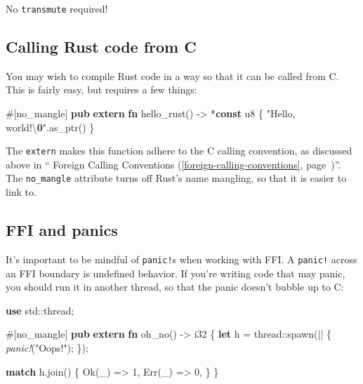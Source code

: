 \documentclass[a4paper,]{book}
\renewcommand*{\hyperlink}[2]{%
 #2 (\autoref{#1}, page~\pageref{#1})}
\newenvironment{Shaded}{\begin{snugshade}}{\end{snugshade}}
\newcommand{\KeywordTok}[1]{\textcolor[rgb]{0.13,0.29,0.53}{\textbf{{#1}}}}
\newcommand{\DataTypeTok}[1]{\textcolor[rgb]{0.13,0.29,0.53}{{#1}}}
\newcommand{\DecValTok}[1]{\textcolor[rgb]{0.00,0.00,0.81}{{#1}}}
\newcommand{\ConstantTok}[1]{\textcolor[rgb]{0.00,0.00,0.00}{{#1}}}
\newcommand{\SpecialCharTok}[1]{\textcolor[rgb]{0.00,0.00,0.00}{{#1}}}
\newcommand{\StringTok}[1]{\textcolor[rgb]{0.31,0.60,0.02}{{#1}}}
\newcommand{\PreprocessorTok}[1]{\textcolor[rgb]{0.56,0.35,0.01}{\textit{{#1}}}}
\newcommand{\AttributeTok}[1]{\textcolor[rgb]{0.77,0.63,0.00}{{#1}}}
\newcommand{\ErrorTok}[1]{\textcolor[rgb]{0.64,0.00,0.00}{\textbf{{#1}}}}
\newcommand{\NormalTok}[1]{{#1}}
\begin{document}
No \texttt{transmute} required!

\subsection{Calling Rust code from C}\label{calling-rust-code-from-c}

You may wish to compile Rust code in a way so that it can be called from
C. This is fairly easy, but requires a few things:

\begin{Shaded}
\begin{Highlighting}[]
\AttributeTok{#[}\NormalTok{no_mangle}\AttributeTok{]}
\KeywordTok{pub} \KeywordTok{extern} \KeywordTok{fn} \NormalTok{hello_rust() -> *}\KeywordTok{const} \DataTypeTok{u8} \NormalTok{\{}
    \StringTok{"Hello, world!}\SpecialCharTok{\textbackslash{}}\ErrorTok{0}\StringTok{"}\NormalTok{.as_ptr()}
\NormalTok{\}}
\end{Highlighting}
\end{Shaded}

The \texttt{extern} makes this function adhere to the C calling
convention, as discussed above in
``\protect\hyperlink{foreign-calling-conventions}{Foreign Calling
Conventions}''. The \texttt{no\_mangle} attribute turns off Rust's name
mangling, so that it is easier to link to.

\subsection{FFI and panics}\label{ffi-and-panics}

It's important to be mindful of \texttt{panic!}s when working with FFI.
A \texttt{panic!} across an FFI boundary is undefined behavior. If
you're writing code that may panic, you should run it in another thread,
so that the panic doesn't bubble up to C:

\begin{Shaded}
\begin{Highlighting}[]
\KeywordTok{use} \NormalTok{std::thread;}

\AttributeTok{#[}\NormalTok{no_mangle}\AttributeTok{]}
\KeywordTok{pub} \KeywordTok{extern} \KeywordTok{fn} \NormalTok{oh_no() -> }\DataTypeTok{i32} \NormalTok{\{}
    \KeywordTok{let} \NormalTok{h = thread::spawn(|| \{}
        \PreprocessorTok{panic!}\NormalTok{(}\StringTok{"Oops!"}\NormalTok{);}
    \NormalTok{\});}

    \KeywordTok{match} \NormalTok{h.join() \{}
        \ConstantTok{Ok}\NormalTok{(_) => }\DecValTok{1}\NormalTok{,}
        \ConstantTok{Err}\NormalTok{(_) => }\DecValTok{0}\NormalTok{,}
    \NormalTok{\}}
\NormalTok{\}}
\end{Highlighting}
\end{Shaded}
\end{document}
